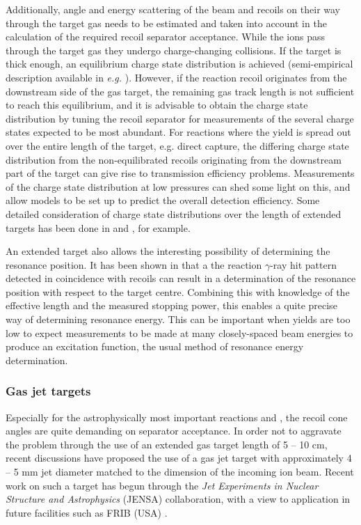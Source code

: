 Additionally, angle and energy scattering of the beam and recoils on their way through the target gas needs to be estimated and taken into account in the calculation of the required recoil separator acceptance. While the ions pass through the target gas they undergo charge-changing collisions. If the target is thick enough, an equilibrium charge state distribution is achieved (semi-empirical description available in {\it e.g.} \cite{liu03}). However, if the reaction recoil originates from the downstream side of the gas target, the remaining gas track length is not sufficient to reach this equilibrium, and it is advisable to obtain the charge state distribution by tuning the recoil separator for measurements of the several charge states expected to be most abundant. For reactions where the yield is spread out over the entire length of the target, e.g. direct capture, the differing charge state distribution from the non-equilibrated recoils originating from the downstream part of the target can give rise to transmission efficiency problems. Measurements of the charge state distribution at low pressures can shed some light on this, and allow models to be set up to predict the overall detection efficiency. Some detailed consideration of charge state distributions over the length of extended targets has been done in \cite{sch04} and \cite{zyl07}, for example.

An extended target also allows the interesting possibility of determining the resonance position. It has been shown in \cite{hut12} that a the reaction $\gamma$-ray hit pattern detected in coincidence with recoils can result in a determination of the resonance position with respect to the target centre. Combining this with knowledge of the effective length and the measured stopping power, this enables a quite precise way of determining resonance energy. This can be important when yields are too low to expect measurements to be made at many closely-spaced beam energies to produce an excitation function, the usual method of resonance energy determination. 


\subsubsection{Gas jet targets}
Especially for the astrophysically most important reactions \reac{\alpha}{\gamma} and \reac{\alpha}{\gamma}, the recoil cone angles are quite demanding on separator acceptance. In order not to aggravate the problem through the use of an extended gas target length of 5 -- 10 cm, recent discussions have proposed the use of a gas jet target with approximately 4 -- 5 mm jet diameter matched to the dimension of the incoming ion beam. Recent work on such a target has begun through the {\em Jet Experiments in Nuclear Structure and Astrophysics} (JENSA) collaboration, with a view to application in future facilities such as FRIB (USA) \cite{chi13}. 

